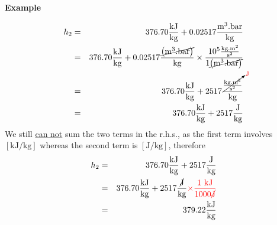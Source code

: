 \begin{MyExample}{\begin{center}{\bf Example}\end{center}}
       \begin{eqnarray}
         h_{2} &=& 376.70\displaystyle\frac{\text{kJ}}{\text{kg}} + 0.02517 \displaystyle\frac{\text{m}^{3}.\text{bar}}{\text{kg}} \nonumber \\
              &=& 376.70\displaystyle\frac{\text{kJ}}{\text{kg}} + 0.02517 \displaystyle\frac{\cancel{\left(\text{m}^{3}.\text{bar}\right)}}{\text{kg}} \times \displaystyle\frac{10^{5} \frac{\text{kg.m}^{2}}{\text{s}^{2}}}{1 \cancel{\left(\text{m}^{3}.\text{bar}\right)}} \nonumber \\
              &=& 376.70\displaystyle\frac{\text{kJ}}{\text{kg}} + 2517 \displaystyle\frac{\cancelto{\textcolor{red}{\text{J}}}{\frac{\text{kg.m}^{2}}{\text{s}^{2}}}}{\text{kg}}\nonumber\\
              &=& 376.70\displaystyle\frac{\text{kJ}}{\text{kg}} + 2517 \displaystyle\frac{\text{J}}{\text{kg}} \nonumber
       \end{eqnarray}
       We still \underline{can not} sum the two terms in the r.h.s., as the first term involves $\left[\text{kJ/kg}\right]$ whereas the second term is $\left[\text{J/kg}\right]$, therefore
       \begin{eqnarray}
         h_{2} &=& 376.70\displaystyle\frac{\text{kJ}}{\text{kg}} + 2517 \displaystyle\frac{\text{J}}{\text{kg}} \nonumber\\
              &=& 376.70\displaystyle\frac{\text{kJ}}{\text{kg}} + 2517 \displaystyle\frac{\cancel{\text{J}}}{\text{kg}} \textcolor{red}{\times \displaystyle\frac{1\text{ kJ}}{1000 \cancel{\text{J}}}}\nonumber\\
              &=& 379.22 \displaystyle\frac{\text{kJ}}{\text{kg}}\nonumber
       \end{eqnarray}

   \end{MyExample}
